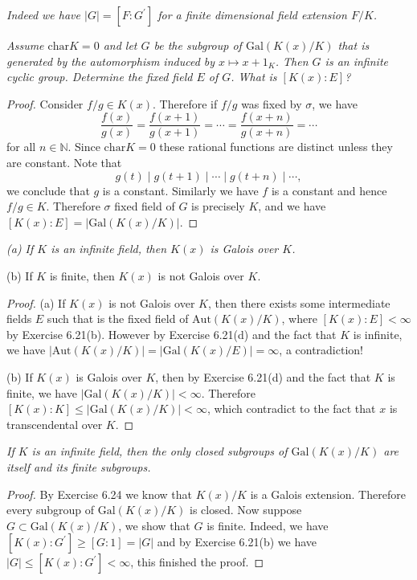 \begin{note}\em
Indeed we have $|G|=[F:G^\prime]$ for a finite dimensional field extension $F/K$.
\end{note}
\begin{problem}\em
Assume $\mathrm{char}K=0$ and let $G$ be the subgroup of $\mathrm{Gal}(K(x)/K)$ that is generated by the automorphism induced by $x\mapsto x+1_K$. Then $G$ is an infinite cyclic group. Determine the fixed field $E$ of $G$. What is $[K(x):E]$?
\end{problem}
\begin{proof}
Consider $f/g\in K(x)$. Therefore if $f/g$ was fixed by $\sigma$, we have 
$$
\frac{f\left( x \right)}{g\left( x \right)}=\frac{f\left( x+1 \right)}{g\left( x+1 \right)}=\cdots =\frac{f\left( x+n \right)}{g\left( x+n \right)}=\cdots 
$$
for all $n\in\mathbb{N}$. Since $\mathrm{char}K=0$ these rational functions are distinct unless they are constant. Note that 
$$
g\left( t \right) \mid g\left( t+1 \right) \mid \cdots \mid g\left( t+n \right) \mid \cdots ,
$$
we conclude that $g$ is a constant. Similarly we have $f$ is a constant and hence $f/g\in K$. Therefore $\sigma$ fixed field of $G$ is precisely $K$, and we have $[K(x):E]=|\mathrm{Gal}(K(x)/K)|$.
\end{proof}
\begin{problem}\em
(a) If $K$ is an infinite field, then $K(x)$ is Galois over $K$.\par
(b) If $K$ is finite, then $K(x)$ is not Galois over $K$.
\end{problem}
\begin{proof}
(a) If $K(x)$ is not Galois over $K$, then there exists some intermediate fields $E$ such that is the fixed field of $\mathrm{Aut}(K(x)/K)$, where $[K(x):E]<\infty$ by Exercise 6.21(b). However by Exercise 6.21(d) and the fact that $K$ is infinite, we have $|\mathrm{Aut}(K(x)/K)|=|\mathrm{Gal}(K(x)/E)|=\infty$, a contradiction!\par
(b) If $K(x)$ is Galois over $K$, then by Exercise 6.21(d) and the fact that $K$ is finite, we have $|\mathrm{Gal}(K(x)/K)|<\infty$. Therefore $[K(x):K]\le|\mathrm{Gal}(K(x)/K)|<\infty$, which contradict to the fact that $x$ is transcendental over $K$.
\end{proof}
\begin{problem}\em
If $K$ is an infinite field, then the only closed subgroups of $\mathrm{Gal}(K(x)/K)$ are itself and its finite subgroups.
\end{problem}
\begin{proof}
By Exercise 6.24 we know that $K(x)/K$ is a Galois extension. Therefore every subgroup of $\mathrm{Gal}(K(x)/K)$ is closed. Now suppose $G\subset\mathrm{Gal}(K(x)/K)$, we show that $G$ is finite. Indeed, we have $[K(x):G^\prime]\ge[G:1]=|G|$ and by Exercise 6.21(b) we have $|G|\le[K(x):G^\prime]<\infty$, this finished the proof.
\end{proof}
